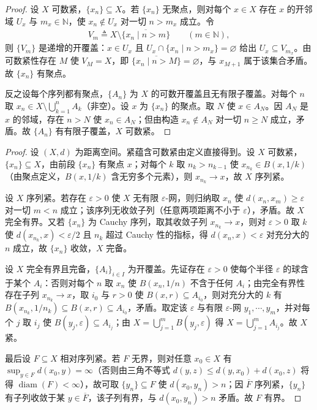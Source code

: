 \documentclass[../main.tex]{subfiles}
\begin{document}
\begin{proof}
设 $X$ 可数紧，$\{x_n\}\subseteq X$。若 $\{x_n\}$ 无聚点，则对每个 $x\in X$ 存在 $x$ 的开邻域 $U_x$ 与 $m_x\in\mathbb{N}$，使 $x_n\notin U_x$ 对一切 $n>m_x$ 成立。令
\begin{align*}
V_m\triangleq X\setminus\overline{\{x_n\mid n>m\}}\qquad(m\in\mathbb{N}),
\end{align*}
则 $\{V_m\}$ 是递增的开覆盖：$x\in U_x$ 且 $U_x\cap\{x_n\mid n>m_x\}=\varnothing$ 给出 $U_x\subseteq V_{m_x}$。由可数紧性存在 $M$ 使 $V_M=X$，即 $\overline{\{x_n\mid n>M\}}=\varnothing$，与 $x_{M+1}$ 属于该集合矛盾。故 $\{x_n\}$ 有聚点。

反之设每个序列都有聚点，$\{A_n\}$ 为 $X$ 的可数开覆盖且无有限子覆盖。对每个 $n$ 取 $x_n\in X\setminus\bigcup_{k=1}^nA_k$（非空）。设 $x$ 为 $\{x_n\}$ 的聚点。取 $N$ 使 $x\in A_N$。因 $A_N$ 是 $x$ 的邻域，存在 $n>N$ 使 $x_n\in A_N$；但由构造 $x_n\notin A_N$ 对一切 $n\geqslant N$ 成立，矛盾。故 $\{A_n\}$ 有有限子覆盖，$X$ 可数紧。
\end{proof}

\begin{proof}
设 $(X,d)$ 为距离空间。紧蕴含可数紧由定义直接得到。设 $X$ 可数紧，$\{x_n\}\subseteq X$，由前段 $\{x_n\}$ 有聚点 $x$；对每个 $k$ 取 $n_k>n_{k-1}$ 使 $x_{n_k}\in B(x,1/k)$（由聚点定义，$B(x,1/k)$ 含无穷多个元素），则 $x_{n_k}\to x$，故 $X$ 序列紧。

设 $X$ 序列紧。若存在 $\varepsilon>0$ 使 $X$ 无有限 $\varepsilon$-网，则归纳取 $x_n$ 使 $d(x_n,x_m)\geqslant\varepsilon$ 对一切 $m<n$ 成立；该序列无收敛子列（任意两项距离不小于 $\varepsilon$），矛盾。故 $X$ 完全有界。又若 $\{x_n\}$ 为 Cauchy 序列，取其收敛子列 $x_{n_k}\to x$，则对 $\varepsilon>0$ 取 $k$ 使 $d(x_{n_k},x)<\varepsilon/2$ 且 $n_k$ 超过 Cauchy 性的指标，得 $d(x_n,x)<\varepsilon$ 对充分大的 $n$ 成立，故 $\{x_n\}$ 收敛，$X$ 完备。

设 $X$ 完全有界且完备，$\{A_i\}_{i\in I}$ 为开覆盖。先证存在 $\varepsilon>0$ 使每个半径 $\varepsilon$ 的球含于某个 $A_i$：否则对每个 $n$ 取 $x_n$ 使 $B(x_n,1/n)$ 不含于任何 $A_i$；由完全有界性存在子列 $x_{n_k}\to x$，取 $i_0$ 与 $r>0$ 使 $B(x,r)\subseteq A_{i_0}$，则对充分大的 $k$ 有 $B(x_{n_k},1/n_k)\subseteq B(x,r)\subseteq A_{i_0}$，矛盾。取定该 $\varepsilon$ 与有限 $\varepsilon$-网 $y_1,\cdots ,y_m$，并对每个 $j$ 取 $i_j$ 使 $B(y_j,\varepsilon)\subseteq A_{i_j}$；由 $X=\bigcup_{j=1}^mB(y_j,\varepsilon)$ 得 $X=\bigcup_{j=1}^mA_{i_j}$。故 $X$ 紧。

最后设 $F\subseteq X$ 相对序列紧。若 $F$ 无界，则对任意 $x_0\in X$ 有 $\sup_{y\in F}d(x_0,y)=\infty$（否则由三角不等式 $d(y,z)\leqslant d(y,x_0)+d(x_0,z)$ 将得 $\operatorname{diam}(F)<\infty$），故可取 $\{y_n\}\subseteq F$ 使 $d(x_0,y_n)>n$；因 $\overline{F}$ 序列紧，$\{y_n\}$ 有子列收敛于某 $y\in\overline{F}$，该子列有界，与 $d(x_0,y_n)>n$ 矛盾。故 $F$ 有界。
\end{proof}
\end{document}
